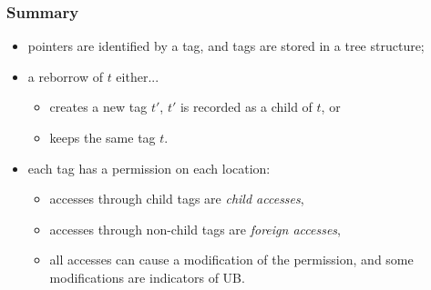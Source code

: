 \begin{frame}
    \frametitle{Summary}
    \begin{itemize}
        \item pointers are identified by a tag, and tags are stored in a tree structure;
        \item a reborrow of \(t\) either...
            \begin{itemize}
                \item creates a new tag \(t'\), \(t'\) is recorded as a child of \(t\), or
                \item keeps the same tag \(t\).
            \end{itemize}
        \item each tag has a permission on each location:
            \begin{itemize}
                \item accesses through child tags are \textit{child accesses},
                \item accesses through non-child tags are \textit{foreign accesses},
                \item all accesses can cause a modification of the permission, and some modifications are indicators of UB.
            \end{itemize}
    \end{itemize}
\end{frame}
